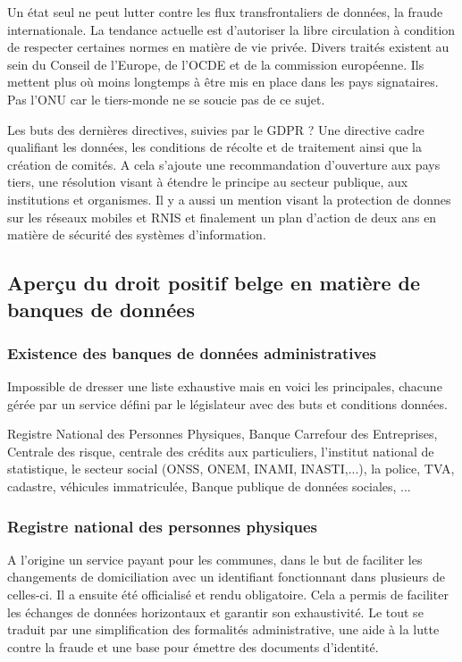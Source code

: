 \documentclass[fleqn,letterpaper, 12pt]{article}
\begin{document}
	Un état seul ne peut lutter contre les flux transfrontaliers de données, la fraude internationale. La tendance actuelle est d'autoriser la libre circulation à condition de respecter certaines normes en matière de vie privée. Divers traités existent au sein du Conseil de l'Europe, de l'OCDE et de la commission européenne. Ils mettent plus où moins longtemps à être mis en place dans les pays signataires. Pas l'ONU car le tiers-monde ne se soucie pas de ce sujet.
	
	Les buts des dernières directives, suivies par le GDPR ? Une directive cadre qualifiant les données, les conditions de récolte et de traitement ainsi que la création de comités. A cela s'ajoute une recommandation d'ouverture aux pays tiers, une résolution visant à étendre le principe au secteur publique, aux institutions et organismes. Il y a aussi un mention visant la protection de donnes sur les réseaux mobiles et RNIS et finalement un plan d'action de deux ans en matière de sécurité des systèmes d'information.
	
	\subsection{Aperçu du droit positif belge en matière de banques de données}
	\subsubsection{Existence des banques de données administratives}
	Impossible de dresser une liste exhaustive mais en voici les principales, chacune gérée par un service défini par le législateur avec des buts et conditions données.
	
	Registre National des Personnes Physiques, Banque Carrefour des Entreprises, Centrale des risque, centrale des crédits aux particuliers, l'institut national de statistique, le secteur social (ONSS, ONEM, INAMI, INASTI,...), la police, TVA, cadastre, véhicules immatriculée, Banque publique de données sociales, ...
	
	
	\subsubsection{Registre national des personnes physiques}
	
	A l'origine un service payant pour les communes, dans le but de faciliter les changements de domiciliation avec un identifiant fonctionnant dans plusieurs de celles-ci. Il a ensuite été officialisé et rendu obligatoire. Cela a permis de faciliter les échanges de données horizontaux et garantir son exhaustivité. Le tout se traduit par une simplification des formalités administrative, une aide à la lutte contre la fraude et une base pour émettre des documents d'identité. 
	
\end{document}
